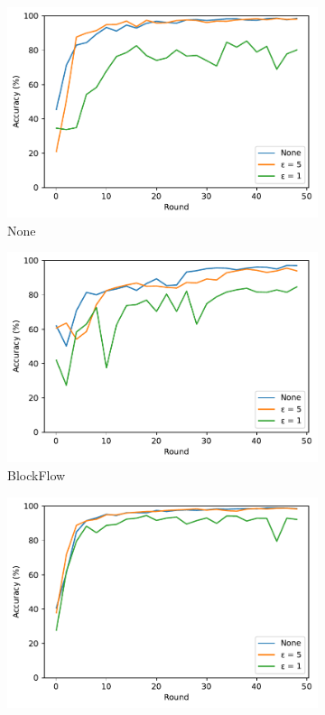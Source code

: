 \begin{figure}[!ht]
    \centering
    \begin{subfigure}[b]{0.49\textwidth}
        \centering
        \includegraphics[width=\textwidth]{graphics/05_priv_accuracy_none.pdf}
        \caption{None}
    \end{subfigure}
    \hfill
    \begin{subfigure}[b]{0.49\textwidth}
        \centering
        \includegraphics[width=\textwidth]{graphics/05_priv_accuracy_blockflow.pdf}
        \caption{BlockFlow}
    \end{subfigure}
    \hfill
    \begin{subfigure}[b]{0.49\textwidth}
        \centering
        \includegraphics[width=\textwidth]{graphics/05_priv_accuracy_marginalgain.pdf}

\end{subfigure}
\end{figure}

